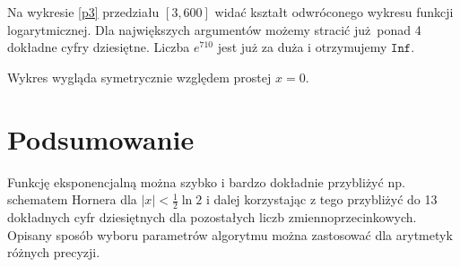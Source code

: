 \documentclass[a4paper, 12pt]{article}
\begin{document}
Na wykresie \ref{p3} przedziału $[3, 600]$ widać kształt odwróconego wykresu
funkcji logarytmicznej.
Dla największych argumentów możemy stracić już ponad 4 dokładne cyfry
dziesiętne.
Liczba $e^{710}$ jest już za duża i otrzymujemy $\mathtt{Inf}$.

Wykres wygląda symetrycznie względem prostej $x=0$.


\section{Podsumowanie}
Funkcję eksponencjalną można szybko i bardzo dokładnie przybliżyć np. schematem
Hornera dla $|x| < \frac{1}{2}\ln 2$ i dalej korzystając z tego przybliżyć do 13
dokładnych cyfr dziesiętnych dla pozostałych liczb zmiennoprzecinkowych.
Opisany sposób wyboru parametrów algorytmu można zastosować dla arytmetyk
różnych precyzji.
\end{document}
